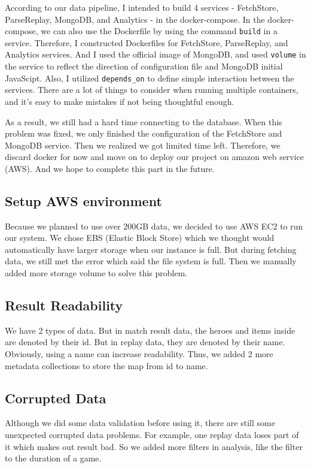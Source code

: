 \documentclass{article}
\newcommand{\codeinline}[1]{
    \texttt{#1}
}
\begin{document}
According to our data pipeline, I intended to build 4 services - FetchStore, ParseReplay, MongoDB, and Analytics - in the docker-compose.
In the docker-compose, we can also use the Dockerfile by using the command \codeinline{build} in a service.
Therefore, I constructed Dockerfiles for FetchStore, ParseReplay, and Analytics services.
And I used the official image of MongoDB, and used \codeinline{volume} in the service to reflect the direction of configuration file and MongoDB initial JavaScipt.
Also, I utilized \codeinline{depends_on} to define simple interaction between the services.
There are a lot of things to consider when running multiple containers, and it's easy to make mistakes if not being thoughtful enough.

As a result, we still had a hard time connecting to the database.
When this problem was fixed, we only finished the configuration of the FetchStore and MongoDB service.
Then we realized we got limited time left. Therefore, we discard docker for now and move on to deploy our project on amazon web service (AWS).
And we hope to complete this part in the future.

\subsection{Setup AWS environment}

Because we planned to use over 200GB data, we decided to use AWS EC2 to run our system. We chose EBS (Elastic Block Store) which we thought would automatically have larger storage when our instance is full. But during fetching data, we still met the error which said the file system is full. Then we manually added more storage volume to solve this problem.

\subsection{Result Readability}

We have 2 types of data. But in match result data, the heroes and items inside are denoted by their id. But in replay data, they are denoted by their name. Obviously, using a name can increase readability. Thus, we added 2 more metadata collections to store the map from id to name.

\subsection{Corrupted Data}

Although we did some data validation before using it, there are still some unexpected corrupted data problems. For example, one replay data loses part of it which makes out result bad. So we added more filters in analysis, like the filter to the duration of a game.
\end{document}
